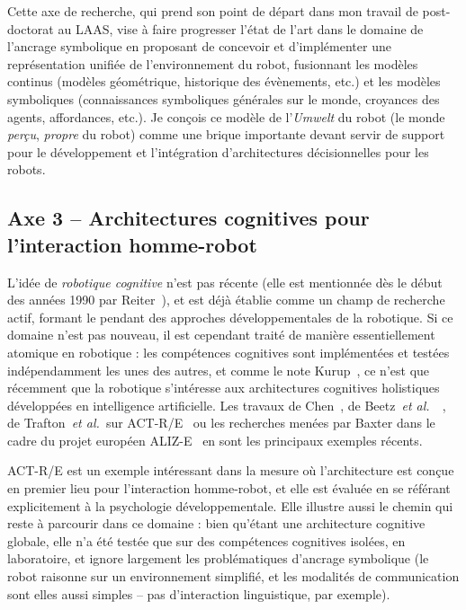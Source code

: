 \documentclass[a4paper]{article}
\newcommand{\etal}{{\textit{et al.~}}}
\begin{document}
Cette axe de recherche, qui prend son point de départ dans mon travail de
post-doctorat au LAAS, vise à faire progresser l'état de l'art dans le domaine
de l'ancrage symbolique en proposant de concevoir et d'implémenter une
représentation unifiée de l'environnement du robot, fusionnant les modèles
continus (modèles géométrique, historique des évènements, etc.) et les modèles
symboliques (connaissances symboliques générales sur le monde, croyances des
agents, affordances, etc.). Je conçois ce modèle de l'\emph{Umwelt} du robot (le
monde \emph{perçu}, \emph{propre} du robot) comme une brique importante devant
servir de support pour le développement et l'intégration d'architectures
décisionnelles pour les robots.

\subsection{Axe 3 -- Architectures cognitives pour l'interaction homme-robot}

L'idée de \emph{robotique cognitive} n'est pas récente (elle est mentionnée dès
le début des années 1990 par Reiter~\cite{Levesque2008}), et est déjà établie
comme un champ de recherche actif, formant le pendant des approches
développementales de la robotique. Si ce domaine n'est pas nouveau, il est cependant
traité de manière essentiellement atomique en robotique : les compétences
cognitives sont implémentées et testées indépendamment les unes des autres, et
comme le note Kurup~\cite{kurup2012what}, ce n'est que récemment que la
robotique s'intéresse aux architectures cognitives holistiques développées en
intelligence artificielle. Les travaux de Chen~\cite{Chen2010}, de
Beetz~\etal~\cite{Beetz2010}, de Trafton~\etal sur ACT-R/E~\cite{trafton2013act}
ou les recherches menées par Baxter dans le cadre du projet européen
ALIZ-E~\cite{baxter2013cognitive} en sont les principaux exemples récents.

ACT-R/E est un exemple intéressant dans la mesure où l'architecture est conçue
en premier lieu pour l'interaction homme-robot, et elle est évaluée en se
référant explicitement à la psychologie développementale. Elle illustre aussi le
chemin qui reste à parcourir dans ce domaine : bien qu'étant une architecture
cognitive globale, elle n'a été testée que sur des compétences cognitives
isolées, en laboratoire, et ignore largement les problématiques d'ancrage
symbolique (le robot raisonne sur un environnement simplifié, et les modalités
de communication sont elles aussi simples -- pas d'interaction linguistique, par
exemple).
\end{document}
